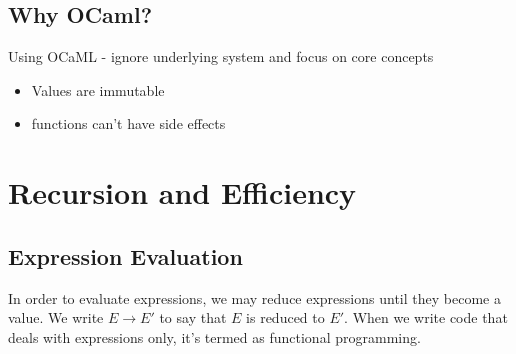 \documentclass[12pt,a4paper]{article} %
\begin{document}
\subsection{Why OCaml?}
Using OCaML - ignore underlying system and focus on core concepts
\begin{itemize}
\item Values are immutable
\item functions can't have side effects
\end{itemize}
\section{Recursion and Efficiency}
\subsection{Expression Evaluation}
In order to evaluate expressions, we may reduce expressions until they become a value. We write $E \rightarrow E'$ to say that $E$ is reduced to $E'$. When we write code that deals with expressions only, it's termed as functional programming.
\end{document}
